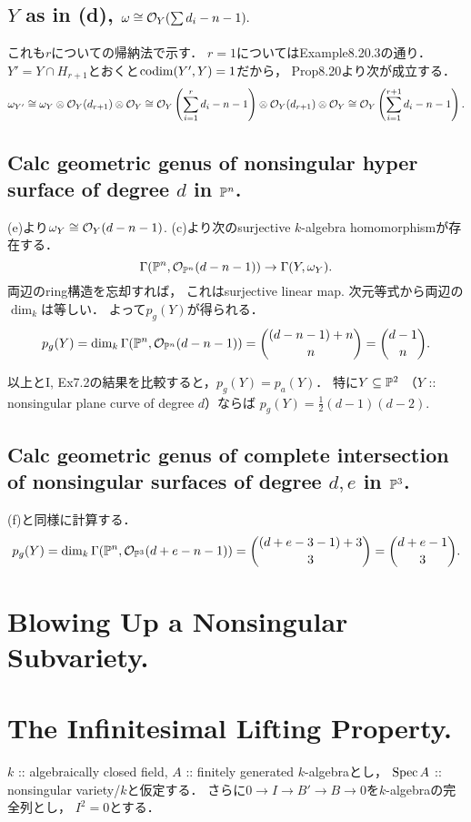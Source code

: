 \documentclass[a4paper]{jsarticle}
\newcommand{\shCano}{\omega}
\begin{document}
    \subsection{$Y$ as in (d), $\shCano \iso \shO_Y(\sum d_i-n-1).$}
    これも$r$についての帰納法で示す．
    $r=1$についてはExample8.20.3の通り．
    $Y'=Y \cap H_{r+1}$とおくと$\operatorname{codim}(Y', Y)=1$だから，
    Prop8.20より次が成立する．
    \[
        \shCano_{Y'}
        \iso \shCano_Y \otimes \shO_Y(d_{r+1}) \otimes \shO_Y
        \iso \shO_Y \left(\sum_{i=1}^r d_i-n-1 \right) \otimes \shO_Y(d_{r+1}) \otimes \shO_Y
        \iso \shO_Y \left(\sum_{i=1}^{r+1} d_i-n-1 \right).
    \]

    \subsection{Calc geometric genus of nonsingular hyper surface of degree $d$ in $\mathbb{P}^n$.}
    (e)より$\shCano_Y \iso \shO_Y(d-n-1)$.
    (c)より次のsurjective $k$-algebra homomorphismが存在する．
    \[ \Gamma(\proj^n, \shO_{\proj^n}(d-n-1)) \to \Gamma(Y, \shCano_Y). \]
    両辺のring構造を忘却すれば，
    これはsurjective linear map.
    次元等式から両辺の$\dim_k$は等しい．
    よって$p_g(Y)$が得られる．
    \[
        p_g(Y)
        =\dim_k \Gamma(\mathbb{P}^n, \mathcal{O}_{\mathbb{P}^n}(d-n-1))
        =\binom{(d-n-1)+n}{n}
        =\binom{d-1}{n}.
    \]

    以上とI, Ex7.2の結果を比較すると，$p_g(Y)=p_a(Y)$．
    特に$Y \subseteq \mathbb{P}^2$
    （$Y$ :: nonsingular plane curve of degree $d$）ならば
    $p_g(Y)=\frac{1}{2}(d-1)(d-2)$.

    \subsection{Calc geometric genus of 
        complete intersection of nonsingular surfaces of degree $d,e$ in $\mathbb{P}^3$.}
    (f)と同様に計算する．
    \[
        p_g(Y)
        =\dim_k \Gamma(\mathbb{P}^n, \mathcal{O}_{\mathbb{P}^3}(d+e-n-1))
        =\binom{(d+e-3-1)+3}{3}
        =\binom{d+e-1}{3}.
    \]

\section{Blowing Up a Nonsingular Subvariety.} %

\section{The Infinitesimal Lifting Property.} %
    $k$ :: algebraically closed field,
    $A$ :: finitely generated $k$-algebraとし，
    $\operatorname{Spec} A$ :: nonsingular variety/$k$と仮定する．
    さらに$0 \to I \to B' \to B \to 0$を$k$-algebraの完全列とし，
    $I^2=0$とする．
\end{document}
